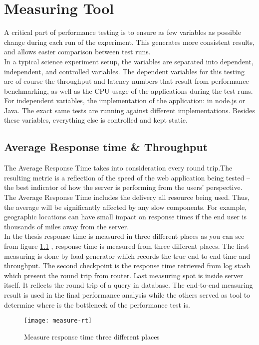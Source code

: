 \chapter{Measuring Tool}
A critical part of performance testing is to ensure as few variables as possible change during each run of the experiment. This generates more consistent results, and allows easier comparison between test runs.\\
In a typical science experiment setup, the variables are separated into dependent, independent, and controlled variables. The dependent variables for this testing are of course the throughput and latency numbers that result from performance benchmarking, as well as the CPU usage of the applications during the test runs. For independent variables, the implementation of the application: in node.js or Java. The exact same tests are running against different implementations. Besides these variables, everything else is controlled and kept static.\\


\section{Average Response time & Throughput}
The Average Response Time takes into consideration every round trip.The resulting metric is a reflection of the speed of the web application being tested – the best indicator of how the server is performing from the users’ perspective. The Average Response Time includes the delivery all resource being used. Thus, the average will be significantly affected by any slow components. For example,  geographic locations can have small impact on response times if the end user is thousands of miles away from the server.\\
In the thesis response time is measured in three different places as you can see from figure \ref{measure-rt} , response time is measured from three different places. The first measuring is done by load generator which records the true end-to-end time and throughput. The second checkpoint is the response time retrieved from log stash which present the round trip from router. Last measuring spot is inside server itself. It reflects the round trip of a query in database. The end-to-end measuring result is used in the final performance analysis while the others served as tool to determine where is the bottleneck of the performance test is. \\

\begin{figure}[h]
	\centering
	\texttt{[image: measure-rt]}
	\caption{Measure response time three different places}
	\label{measure-rt}
\end{figure}

